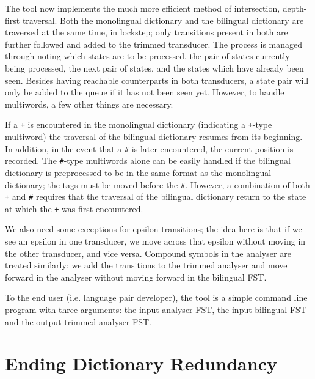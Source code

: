 \documentclass[10pt, a4paper]{article}
\newcommand{\ana}[1]{\texttt{#1}}
\begin{document}
The tool now implements the much more efficient method of
intersection, depth-first traversal.  Both the monolingual dictionary
and the bilingual dictionary are traversed at the same time, in
lockstep; only transitions present in both are further followed and
added to the trimmed transducer.  The process is managed through
noting which states are to be processed, the pair of states currently
being processed, the next pair of states, and the states which have
already been seen.  Besides having reachable counterparts in both
transducers, a state pair will only be added to the queue if it has
not been seen yet.  However, to handle multiwords, a few other things
are necessary.

If a \ana{+} is encountered in the monolingual dictionary (indicating
a \ana{+}-type multiword) the traversal of the bilingual dictionary
resumes from its beginning. In addition, in the event that a \ana{\#}
is later encountered, the current position is recorded. The
\ana{\#}-type multiwords alone can be easily handled if the bilingual
dictionary is preprocessed to be in the same format as the monolingual
dictionary; the tags must be moved before the \ana{\#}.  However, a
combination of both \ana{+} and \ana{\#} requires that the traversal of the
bilingual dictionary return to the state at which the \ana{+} was
first encountered.

We also need some exceptions for epsilon transitions; the idea here is
that if we see an epsilon in one transducer, we move across that
epsilon without moving in the other transducer, and vice versa.
Compound symbols in the analyser are treated similarly: we add the
transitions to the trimmed analyser and move forward in the analyser
without moving forward in the bilingual FST.

To the end user (i.e. language pair developer), the tool is a simple
command line program with three arguments: the input analyser FST, the
input bilingual FST and the output trimmed analyser FST.

\section{Ending Dictionary Redundancy}
\end{document}
